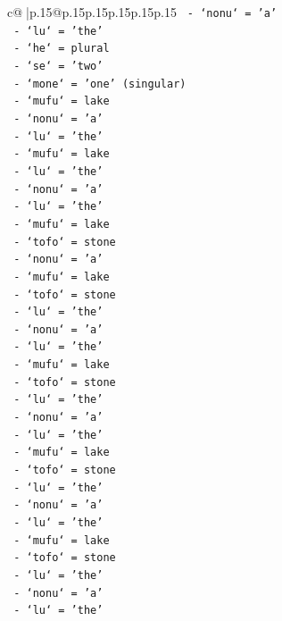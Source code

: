 \documentclass{article}
\begin{document}
{\begin{supertabular}{c@{$\;$}|p{.15\linewidth}@{}p{.15\linewidth}p{.15\linewidth}p{.15\linewidth}p{.15\linewidth}p{.15\linewidth}}
{{{\texttt{      {-} `nonu` = 'a'} \\
\texttt{      {-} `lu` = 'the'} \\
\texttt{      {-} `he` = plural} \\
\texttt{      {-} `se` = 'two'} \\
\texttt{      {-} `mone` = 'one' (singular)} \\
\texttt{      {-} `mufu` = lake} \\
\texttt{      {-} `nonu` = 'a'} \\
\texttt{      {-} `lu` = 'the'} \\
\texttt{      {-} `mufu` = lake} \\
\texttt{      {-} `lu` = 'the'} \\
\texttt{      {-} `nonu` = 'a'} \\
\texttt{      {-} `lu` = 'the'} \\
\texttt{      {-} `mufu` = lake} \\
\texttt{      {-} `tofo` = stone} \\
\texttt{      {-} `nonu` = 'a'} \\
\texttt{      {-} `mufu` = lake} \\
\texttt{      {-} `tofo` = stone} \\
\texttt{      {-} `lu` = 'the'} \\
\texttt{      {-} `nonu` = 'a'} \\
\texttt{      {-} `lu` = 'the'} \\
\texttt{      {-} `mufu` = lake} \\
\texttt{      {-} `tofo` = stone} \\
\texttt{      {-} `lu` = 'the'} \\
\texttt{      {-} `nonu` = 'a'} \\
\texttt{      {-} `lu` = 'the'} \\
\texttt{      {-} `mufu` = lake} \\
\texttt{      {-} `tofo` = stone} \\
\texttt{      {-} `lu` = 'the'} \\
\texttt{      {-} `nonu` = 'a'} \\
\texttt{      {-} `lu` = 'the'} \\
\texttt{      {-} `mufu` = lake} \\
\texttt{      {-} `tofo` = stone} \\
\texttt{      {-} `lu` = 'the'} \\
\texttt{      {-} `nonu` = 'a'} \\
\texttt{      {-} `lu` = 'the'} \\
}}}
\end{supertabular}}
\end{document}
